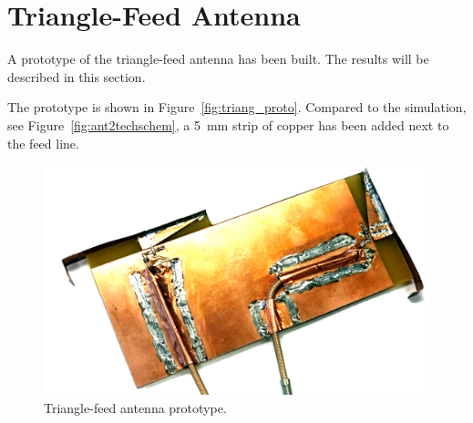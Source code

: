 \section{Triangle-Feed Antenna}

A prototype of the triangle-feed antenna has been built. The results will be described in this section.

The prototype is shown in Figure~\ref{fig:triang_proto}. Compared to the simulation, see Figure~\ref{fig:ant2techschem}, a \SI{5}{mm} strip of copper has been added next to the feed line.

\begin{figure}[htbp]
    \centering
    \includegraphics{img/tech_sol/trianglefeed/mockup/mockup.jpg}
    \caption{Triangle-feed antenna prototype.}
    \label{fig:triang_prototype}
\end{figure}
